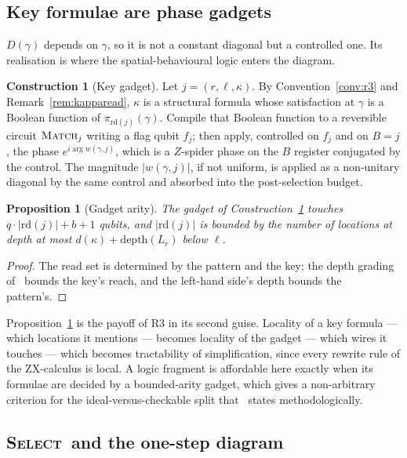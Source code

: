 \documentclass[11pt]{article}
\theoremstyle{definition}
\newtheorem{construction}[definition]{Construction}
\theoremstyle{plain}
\newtheorem{proposition}[definition]{Proposition}
\newcommand{\SEL}{\textsc{Select}}
\newcommand{\MATCH}{\textsc{Match}}
\begin{document}
\subsection{Key formulae are phase gadgets}\label{ssec:keys}

$D(\gamma)$ depends on $\gamma$, so it is not a constant diagonal but a controlled one. Its
realisation is where the spatial-behavioural logic enters the diagram.

\begin{construction}[Key gadget]\label{con:keygadget}
Let $j = (r,\ell,\kappa)$. By Convention~\ref{conv:r3} and Remark~\ref{rem:kapparead}, $\kappa$
is a structural formula whose satisfaction at $\gamma$ is a Boolean function of
$\pi_{\mathrm{rd}(j)}(\gamma)$. Compile that Boolean function to a reversible circuit
$\MATCH_j$ writing a flag qubit $f_j$; then apply, controlled on $f_j$ and on $B = j$, the phase
$e^{i\arg w(\gamma,j)}$, which is a $Z$-spider phase on the $B$ register conjugated by the
control. The magnitude $|w(\gamma,j)|$, if not uniform, is applied as a non-unitary diagonal by
the same control and absorbed into the post-selection budget.
\end{construction}

\begin{proposition}[Gadget arity]\label{prop:arity}
The gadget of Construction~\ref{con:keygadget} touches $q\cdot|\mathrm{rd}(j)| + b + 1$ qubits,
and $|\mathrm{rd}(j)|$ is bounded by the number of locations at depth at most
$d(\kappa) + \mathrm{depth}(L_r)$ below $\ell$.
\end{proposition}

\begin{proof}
The read set is determined by the pattern and the key; the depth grading of~\cite[\S3]{weighted}
bounds the key's reach, and the left-hand side's depth bounds the pattern's.
\end{proof}

Proposition~\ref{prop:arity} is the payoff of R3 in its second guise. Locality of a key formula
--- which locations it mentions --- becomes locality of the gadget --- which wires it touches ---
which becomes tractability of simplification, since every rewrite rule of the ZX-calculus is
local. A logic fragment is affordable here exactly when its formulae are decided by a
bounded-arity gadget, which gives a non-arbitrary criterion for the ideal-versus-checkable split
that~\cite{weighted} states methodologically.

\subsection{\SEL\ and the one-step diagram}\label{ssec:onestep}
\end{document}
